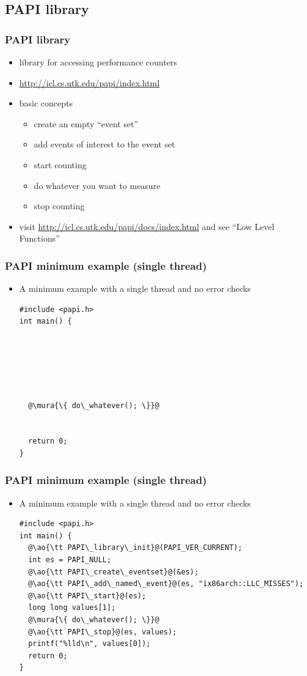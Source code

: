 \documentclass[12pt,dvipdfmx]{beamer}
\newcommand{\mura}[1]{{\color{purple}#1}}
\newcommand{\ao}[1]{{\color{blue}#1}}
\begin{document}
\subsection{PAPI library}
\begin{frame}
\frametitle{PAPI library}
\begin{itemize}
\item library for accessing performance counters
\item \url{http://icl.cs.utk.edu/papi/index.html}
\item basic concepts
  \begin{itemize}
  \item create an empty ``event set''
  \item add events of interest to the event set
  \item start counting
  \item do whatever you want to measure
  \item stop counting
  \end{itemize}
\item visit \url{http://icl.cs.utk.edu/papi/docs/index.html}
  and see ``Low Level Functions''
\end{itemize}
\end{frame}


\begin{frame}[fragile]
\frametitle{PAPI minimum example (single thread)}
\begin{itemize}
\item A minimum example with a single thread and no error checks
\begin{lstlisting}
#include <papi.h>
int main() {






  @\mura{\{ do\_whatever(); \}}@


  return 0;
}
\end{lstlisting}
\end{itemize}
\end{frame}


\begin{frame}[fragile]
\frametitle{PAPI minimum example (single thread)}
\begin{itemize}
\item A minimum example with a single thread and no error checks
\begin{lstlisting}
#include <papi.h>
int main() {
  @\ao{\tt PAPI\_library\_init}@(PAPI_VER_CURRENT);
  int es = PAPI_NULL; 
  @\ao{\tt PAPI\_create\_eventset}@(&es);
  @\ao{\tt PAPI\_add\_named\_event}@(es, "ix86arch::LLC_MISSES");
  @\ao{\tt PAPI\_start}@(es);
  long long values[1];
  @\mura{\{ do\_whatever(); \}}@
  @\ao{\tt PAPI\_stop}@(es, values);
  printf("%lld\n", values[0]);
  return 0;
}
\end{lstlisting}
\end{itemize}
\end{frame}
\end{document}

